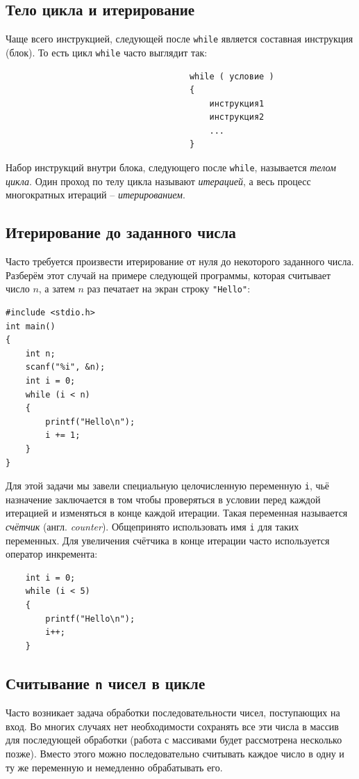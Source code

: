 \documentclass[10pt]{article}
\begin{document}
\subsection*{Тело цикла и итерирование}
Чаще всего инструкцией, следующей после \texttt{while} является составная инструкция (блок). То есть цикл \texttt{while} часто выглядит так:
\begin{lstlisting}
                                     while ( условие )
                                     {
                                         инструкция1
                                         инструкция2
                                         ...
                                     }
\end{lstlisting}
Набор инструкций внутри блока, следующего после \texttt{while}, называется \textit{телом цикла}.
Один проход по телу цикла называют \textit{итерацией}, а весь процесс многократных итераций -- \textit{итерированием}.

\subsection*{Итерирование до заданного числа}
Часто требуется произвести итерирование от нуля до некоторого заданного числа. Разберём этот случай на примере следующей программы, которая считывает число $n$, а затем $n$ раз печатает на экран строку \texttt{"Hello"{}}:
\begin{lstlisting}
#include <stdio.h>
int main()
{
	int n;
	scanf("%i", &n);
	int i = 0;
    while (i < n)
    {
        printf("Hello\n");
        i += 1;
    }
}
\end{lstlisting}
Для этой задачи мы завели специальную целочисленную переменную \texttt{i}, чьё назначение заключается в том чтобы проверяться в условии перед каждой итерацией и изменяться в конце каждой итерации. Такая переменная называется \textit{счётчик} (англ. \textit{counter}). Общепринято использовать имя \texttt{i} для таких переменных. Для увеличения счётчика в конце итерации часто используется оператор инкремента:
\begin{lstlisting}
	int i = 0;
    while (i < 5)
    {
        printf("Hello\n");
        i++;
    }
\end{lstlisting}

\subsection*{Считывание \texttt{n} чисел в цикле}
Часто возникает задача обработки последовательности чисел, поступающих на вход. Во многих случаях нет необходимости сохранять все эти числа в массив для последующей обработки (работа с массивами будет рассмотрена несколько позже). Вместо этого можно последовательно считывать каждое число в одну и ту же переменную и немедленно обрабатывать его.
\end{document}
